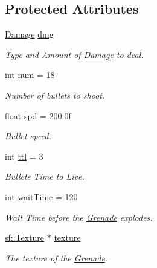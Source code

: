 \subsection*{Protected Attributes}
\begin{DoxyCompactItemize}
\item 
\mbox{\label{class_grenade_a4a4c644692957a3a30c7f9d6bf93d515}} 
\mbox{\hyperlink{struct_damage}{Damage}} \mbox{\hyperlink{class_grenade_a4a4c644692957a3a30c7f9d6bf93d515}{dmg}}
\begin{DoxyCompactList}\small\item\em Type and Amount of \mbox{\hyperlink{struct_damage}{Damage}} to deal. \end{DoxyCompactList}\item 
\mbox{\label{class_grenade_a95798ab5764e7c099f7a6aab96637847}} 
int \mbox{\hyperlink{class_grenade_a95798ab5764e7c099f7a6aab96637847}{num}} = 18
\begin{DoxyCompactList}\small\item\em Number of bullets to shoot. \end{DoxyCompactList}\item 
\mbox{\label{class_grenade_aa0b44ab29281813257d375a3438dab6a}} 
float \mbox{\hyperlink{class_grenade_aa0b44ab29281813257d375a3438dab6a}{spd}} = 200.\+0f
\begin{DoxyCompactList}\small\item\em \mbox{\hyperlink{class_bullet}{Bullet}} speed. \end{DoxyCompactList}\item 
\mbox{\label{class_grenade_ad63c626fcd4d36dc7c6619814f09d94b}} 
int \mbox{\hyperlink{class_grenade_ad63c626fcd4d36dc7c6619814f09d94b}{ttl}} = 3
\begin{DoxyCompactList}\small\item\em Bullets Time to Live. \end{DoxyCompactList}\item 
\mbox{\label{class_grenade_a8e6633cac683189315f14269c2ec2e68}} 
int \mbox{\hyperlink{class_grenade_a8e6633cac683189315f14269c2ec2e68}{wait\+Time}} = 120
\begin{DoxyCompactList}\small\item\em Wait Time before the \mbox{\hyperlink{class_grenade}{Grenade}} explodes. \end{DoxyCompactList}\item 
\mbox{\label{class_grenade_a3ef77c64f74bd1f4065256f69f0b5e3d}} 
\mbox{\hyperlink{classsf_1_1_texture}{sf\+::\+Texture}} $\ast$ \mbox{\hyperlink{class_grenade_a3ef77c64f74bd1f4065256f69f0b5e3d}{texture}}
\begin{DoxyCompactList}\small\item\em The texture of the \mbox{\hyperlink{class_grenade}{Grenade}}. \end{DoxyCompactList}\end{DoxyCompactItemize}
